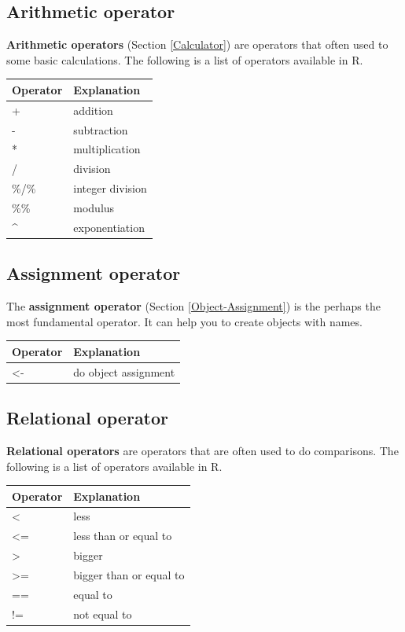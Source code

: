 \documentclass[
]{book}
\begin{document}
\hypertarget{arithmetic-operator}{%
\subsection{Arithmetic operator}\label{arithmetic-operator}}

\textbf{Arithmetic operators} (Section \ref{Calculator}) are operators that often used to some basic calculations. The following is a list of operators available in R.

\begin{tabular}{l|l}
\hline
Operator & Explanation\\
\hline
+ & addition\\
\hline
- & subtraction\\
\hline
* & multiplication\\
\hline
/ & division\\
\hline
\%/\% & integer division\\
\hline
\%\% & modulus\\
\hline
\textasciicircum{} & exponentiation\\
\hline
\end{tabular}

\hypertarget{assignment-operator}{%
\subsection{Assignment operator}\label{assignment-operator}}

The \textbf{assignment operator} (Section \ref{Object-Assignment}) is the perhaps the most fundamental operator. It can help you to create objects with names.

\begin{tabular}{l|l}
\hline
Operator & Explanation\\
\hline
<- & do object assignment\\
\hline
\end{tabular}

\hypertarget{relational-operator}{%
\subsection{Relational operator}\label{relational-operator}}

\textbf{Relational operators} are operators that are often used to do comparisons. The following is a list of operators available in R.

\begin{tabular}{l|l}
\hline
Operator & Explanation\\
\hline
< & less\\
\hline
<= & less than or equal to\\
\hline
> & bigger\\
\hline
>= & bigger than or equal to\\
\hline
== & equal to\\
\hline
!= & not equal to\\
\hline
\end{tabular}
\end{document}
